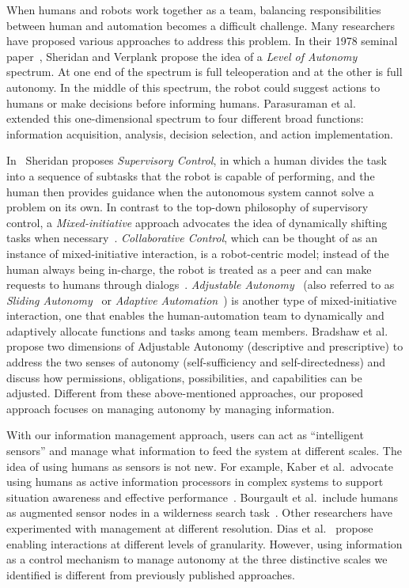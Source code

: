 When humans and robots work together as a team, balancing responsibilities between human and automation becomes a difficult challenge. Many researchers have proposed various approaches to address this problem. In their 1978 seminal paper~\cite{Sheridan1978Human}, Sheridan and Verplank propose the idea of a \textit{Level of Autonomy} spectrum. At one end of the spectrum is full teleoperation and at the other is full autonomy. In the middle of this spectrum, the robot could suggest actions to humans or make decisions before informing humans. Parasuraman et al.\ \cite{Parasuraman2000Model} extended this one-dimensional spectrum to four different broad functions: information acquisition, analysis, decision selection, and action implementation. 

In~\cite{Sheridan1992Telerobotics} Sheridan proposes \textit{Supervisory Control}, in which a human divides the task into a sequence of subtasks that the robot is capable of performing, and the human then provides guidance when the autonomous system cannot solve a problem on its own. In contrast to the top-down philosophy of supervisory control, a \textit{Mixed-initiative} approach advocates the idea of dynamically shifting tasks when necessary~\cite{Hearst1999Mixed}. \textit{Collaborative Control}, which can be thought of as an instance of mixed-initiative interaction, is a robot-centric model; instead of the human always being in-charge, the robot is treated as a peer and can make requests to humans through dialogs~\cite{Fong1999Collaborative}. \textit{Adjustable Autonomy}~\cite{Dorais2001Designing} (also referred to as \textit{Sliding Autonomy}~\cite{Dias2008SlidingAutonomy} or \textit{Adaptive Automation}~\cite{Rouse1988Adaptive}) is another type of mixed-initiative interaction, one that enables the human-automation team to dynamically and adaptively allocate functions and tasks among team members. Bradshaw et al.\ \cite{Bradshaw2004Dimensions} propose two dimensions of Adjustable Autonomy (descriptive  and prescriptive) to address the two senses of autonomy (self-sufficiency and self-directedness) and discuss how permissions, obligations, possibilities, and capabilities can be adjusted. Different from these above-mentioned approaches, our proposed approach focuses on managing autonomy by managing information.

With our information management approach, users can act as ``intelligent sensors'' and manage what information to feed the system at different scales. The idea of using humans as sensors is not new. For example, Kaber et al.\ advocate using humans as active information processors in complex systems to support situation awareness and effective performance~\cite{Kaber2001Design}. Bourgault et al.\ include humans as augmented sensor nodes in a wilderness search task~\cite{Bourgault2008AugmentedNodes}. Other researchers have experimented with management at different resolution. Dias et al.\ \cite{Dias2008SlidingAutonomy} propose enabling interactions at different levels of granularity. However, using information as a control mechanism to manage autonomy at the three distinctive scales we identified is different from previously published approaches.

